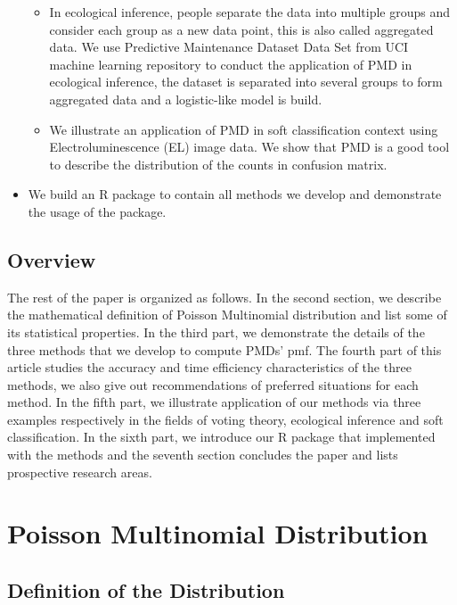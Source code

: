\documentclass[12pt]{article}
\newcommand{\PMD}{\textrm{PMD}}
\begin{document}
\begin{itemize}
\begin{itemize}
		\item In ecological inference, people separate the data into multiple groups and consider each group as a new data point, this is also called aggregated data. We use Predictive Maintenance Dataset Data Set \cite{Dua:2019} from UCI machine learning repository to conduct the application of $\PMD$ in ecological inference, the dataset is separated into several groups to form aggregated data and a logistic-like model is build.
		\item We illustrate an application of $\PMD$ in soft classification context using Electroluminescence (EL) image data. We show that $\PMD$ is a good tool to describe the distribution of the counts in confusion matrix.
	\end{itemize}
	\item We build an R package to contain all methods we develop and demonstrate the usage of the package.
\end{itemize}





\subsection{Overview}
The rest of the paper is organized as follows. In the second section, we describe the mathematical definition of Poisson Multinomial distribution and list some of its statistical properties. In the third part, we demonstrate the details of  the three methods that we develop to compute $\PMD$s' pmf. The fourth part of this article studies the accuracy and time efficiency characteristics of the three methods, we also give out recommendations of preferred situations for each method. In the fifth part, we illustrate application of our methods via three examples respectively in the fields of voting theory, ecological inference and soft classification. In the sixth part, we introduce our R package that implemented with the methods and the seventh section concludes the paper and lists prospective research areas.




\section{Poisson Multinomial Distribution}
\subsection{Definition of the Distribution}
\end{document}
